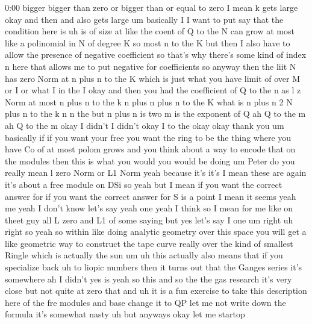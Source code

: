 \begin{unfinished}{0:00}
bigger  bigger  than  zero  or  bigger  than
or  equal  to  zero  I  mean  k  gets  large
okay  and  then  and  also  gets  large  um
basically  I  I  want  to  put  say  that  the
condition  here  is  uh  is  of  size  at
like  the  coent  of  Q  to  the  N  can  grow  at
most  like  a
polinomial  in  N  of  degree  K  so  most  n  to
the  K  but  then  I  also  have  to  allow  the
presence  of  negative  coefficient  so
that's  why  there's  some  kind  of  index  n
here  that  allows  me  to  put  negative  for
coefficients  so  anyway  then  the  liit  N
has  zero  Norm  at  n  plus  n  to  the  K  which
is
just
what  you  have  limit  of  over  M  or  I  or
what  I  in  the  I
okay  and  then  you  had  the  coefficient  of
Q  to  the  n  as  l  z  Norm  at  most  n  plus  n
to  the  k  n  plus  n  plus  n  to  the  K  what
is  n  plus  n  2
N  plus  n  to  the
k  n  n
the  but  n  plus  n  is  two
m  is  the  exponent  of
Q  ah  Q  to  the  m  ah  Q  to  the  m  okay  I
didn't  I  didn't  okay  I  to  the  okay
okay  thank
you  um  basically  if  if  you  want  your
free  you  want  the  ring  to  be  the  thing
where  you  have  Co  of  at  most  polom  grows
and  you  think  about  a  way  to  encode  that
on  the  modules  then  this  is  what  you
would  you  would  be  doing  um  Peter  do  you
really  mean  l  zero  Norm  or  L1  Norm  yeah
because  it's  it's  I  mean  these  are  again
it's  about  a  free  module  on  DSi  so  yeah
but  I  mean  if  you  want  the  correct
answer  for  if  you  want  the  correct
answer  for  S  is  a  point  I  mean  it
seems  yeah  me  yeah  I  don't  know  let's
say  yeah  one  yeah  I  think  so  I  mean  for
me  like  on  theet  guy  all  L  zero  and  L1
of  some
saying  but  yes  let's  say  I
one
um  right
uh  right  so  yeah  so  within  like  doing
analytic  geometry  over  this  space  you
will  get  a  like  geometric  way  to
construct  the  tape  curve  really  over  the
kind  of  smallest  Ringle  which  is
actually  the
sun
um
uh  this  actually  also  means  that  if  you
specialize  back  uh  to  liopic  numbers
then  it  turns  out  that  the  Ganges  series
it's  somewhere  ah  I  didn't  yes  is  yeah
so
this  and  so  the  the  gas  research  it's
very  close  but  not  quite  at  zero
that  and  uh  it  is  a  fun  exercise  to  take
this  description  here  of  the  fre  modules
and  base  change  it  to  QP  let  me  not
write  down  the  formula  it's  somewhat
nasty  uh  but  anyways  okay  let  me
startop
\end{unfinished}
